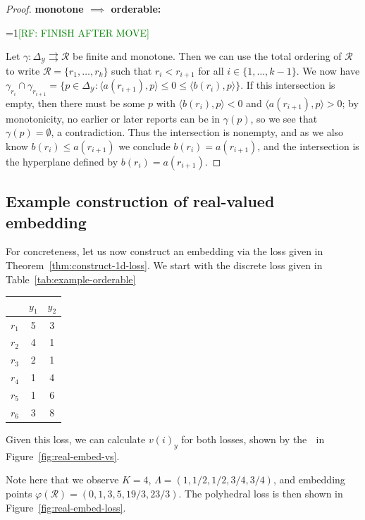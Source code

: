 \documentclass[anon]{colt2020} %
\newcommand{\Comments}{1}
\newcommand{\mynote}[2]{\ifnum\Comments=1\textcolor{#1}{#2}\fi}
\newcommand{\raf}[1]{\mynote{green}{[RF: #1]}}
\newcommand{\simplex}{\Delta_\Y}
\newcommand{\R}{\mathcal{R}}
\newcommand{\Y}{\mathcal{Y}}
\newcommand{\inprod}[2]{\langle #1, #2 \rangle}%
\newcommand{\toto}{\rightrightarrows}
\begin{document}
\begin{proof}
  \noindent\textbf{monotone $\implies$ orderable:}
  
  \raf{FINISH AFTER MOVE}

  Let $\gamma:\simplex\toto\R$ be finite and monotone.
  Then we can use the total ordering of $\R$ to write $\R = \{r_1,\ldots,r_k\}$ such that $r_i < r_{i+1}$ for all $i \in \{1,\ldots,k-1\}$.
  We now have $\gamma_{r_i} \cap \gamma_{r_{i+1}} = \{p\in\simplex : \inprod{a(r_{i+1})}{p} \leq 0 \leq \inprod{b(r_i)}{p} \}$.
  If this intersection is empty, then there must be some $p$ with $\inprod{b(r_i)}{p} < 0$ and $\inprod{a(r_{i+1})}{p} > 0$; by monotonicity, no earlier or later reports can be in $\gamma(p)$, so we see that $\gamma(p) = \emptyset$, a contradiction.
  Thus the intersection is nonempty, and as we also know $b(r_i) \leq a(r_{i+1})$ we conclude $b(r_i) = a(r_{i+1})$, and the intersection is the hyperplane defined by $b(r_i) = a(r_{i+1})$.
\end{proof}


\subsection{Example construction of real-valued embedding}
For concreteness, let us now construct an embedding via the loss given in Theorem~\ref{thm:construct-1d-loss}.
We start with the discrete loss given in Table~\ref{tab:example-orderable}

\begin{center}
\begin{tabular}{c|cc|}	\label{tab:example-orderable}
	& $y_1$& $y_2$ \\ \hline
	$r_1$ & 5 & 3 \\
	$r_2$ & 4 & 1 \\
	$r_3$ & 2 & 1 \\
	$r_4$ & 1 & 4 \\
	$r_5$ & 1 & 6 \\
	$r_6$ & 3 & 8 \\
\end{tabular}
\end{center}

Given this loss, we can calculate $v(i)_y$ for both losses, shown by the \textbullet $\;$ in Figure~\ref{fig:real-embed-vs}.

Note here that we observe $K = 4$, $\Lambda = (1, 1/2, 1/2, 3/4, 3/4)$, and embedding points $\varphi(\R) = (0,1,3,5, 19/3, 23/3)$.
The polyhedral loss is then shown in Figure~\ref{fig:real-embed-loss}.
\end{document}
